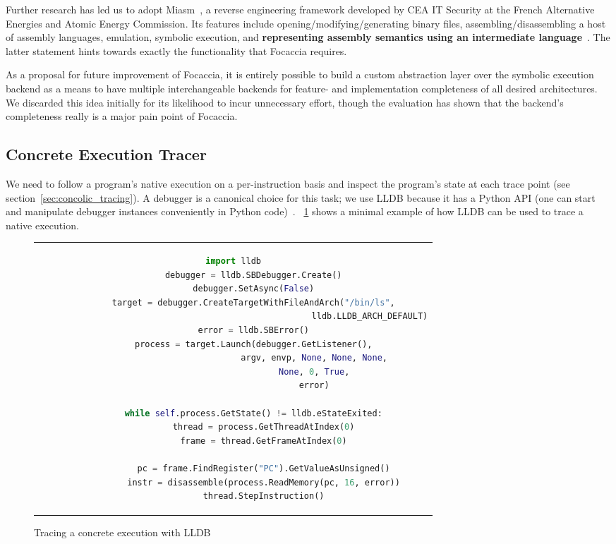 Further research has led us to adopt Miasm~\cite{desclaux2012miasm}, a reverse engineering framework developed by CEA IT
Security at the French Alternative Energies and Atomic Energy Commission. Its features include
opening/modifying/generating binary files, assembling/disassembling a host of assembly languages, emulation, symbolic
execution, and \textbf{representing assembly semantics using an intermediate language}~\cite{cea-sec2024Mar}. The latter
statement hints towards exactly the functionality that Focaccia requires.

As a proposal for future improvement of Focaccia, it is entirely possible to build a custom abstraction layer over the
symbolic execution backend as a means to have multiple interchangeable backends for feature- and implementation
completeness of all desired architectures. We discarded this idea initially for its likelihood to incur unnecessary
effort, though the evaluation has shown that the backend's completeness really is a major pain point of Focaccia.

\subsection{Concrete Execution Tracer}

We need to follow a program's native execution on a per-instruction basis and inspect the program's state at each trace
point (see section~\ref{sec:concolic_tracing}). A debugger is a canonical choice for this task; we use LLDB because it
has a Python API (one can start and manipulate debugger instances conveniently in Python code)~\cite{lldb2024Apr}.
\lstlistingname~\ref{fig:lldb_tracing} shows a minimal example of how LLDB can be used to trace a native execution.

\begin{figure}[htbp]
    \centering
    \begin{tabular}{c}
    \begin{lstlisting}[language=Python]
        import lldb
        debugger = lldb.SBDebugger.Create()
        debugger.SetAsync(False)
        target = debugger.CreateTargetWithFileAndArch("/bin/ls",
                                                      lldb.LLDB_ARCH_DEFAULT)
        error = lldb.SBError()
        process = target.Launch(debugger.GetListener(),
                                argv, envp, None, None, None,
                                None, 0, True,
                                error)

        while self.process.GetState() != lldb.eStateExited:
            thread = process.GetThreadAtIndex(0)
            frame = thread.GetFrameAtIndex(0)

            pc = frame.FindRegister("PC").GetValueAsUnsigned()
            instr = disassemble(process.ReadMemory(pc, 16, error))
            thread.StepInstruction()
    \end{lstlisting}
    \end{tabular}
    \caption{Tracing a concrete execution with LLDB}\label{fig:lldb_tracing}
\end{figure}


